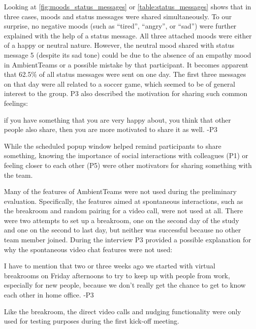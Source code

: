 Looking at \autoref{fig:moods_status_messages} or \autoref{table:status_messages} shows that in three cases, moods and status messages were shared simultaneously. To our surprise, no negative moods (such as \enquote{tired}, \enquote{angry}, or \enquote{sad}) were further explained with the help of a status message. All three attached moods were either of a happy or neutral nature. However, the neutral mood shared with status message 5 (despite its sad tone) could be due to the absence of an empathy mood in AmbientTeams or a possible mistake by that participant. It becomes apparent that 62.5\% of all status messages were sent on one day. The first three messages on that day were all related to a soccer game, which seemed to be of general interest to the group. P3 also described the motivation for sharing such common feelings:

\begin{displayquote}[][]
    [...] if you have something that you are very happy about, you think that other people also share, then you are more motivated to share it as well. -P3
\end{displayquote}

While the scheduled popup window helped remind participants to share something, knowing the importance of social interactions with colleagues (P1) or feeling closer to each other (P5) were other motivators for sharing something with the team.

Many of the features of AmbientTeams were not used during the preliminary evaluation. Specifically, the features aimed at spontaneous interactions, such as the breakroom and random pairing for a video call, were not used at all. There were two attempts to set up a breakroom, one on the second day of the study and one on the second to last day, but neither was successful because no other team member joined. During the interview P3 provided a possible explanation for why the spontaneous video chat features were not used:

\begin{displayquote}[][]
    [...] I have to mention that two or three weeks ago we started with virtual breakrooms on Friday afternoons to try to keep up with people from work, especially for new people, because we don't really get the chance to get to know each other in home office. -P3
\end{displayquote}

Like the breakroom, the direct video calls and nudging functionality were only used for testing purposes during the first kick-off meeting. %

